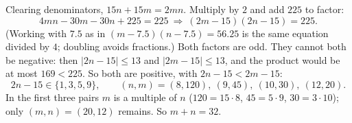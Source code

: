 Clearing denominators, $15n+15m=2mn$. Multiply by $2$ and add $225$ to factor:
\[
4mn-30m-30n+225=225\ \Longrightarrow\ (2m-15)(2n-15)=225 .
\]
(Working with $7.5$ as in $(m-7.5)(n-7.5)=56.25$ is the same equation divided by $4$; doubling avoids fractions.) Both factors are odd. They cannot both be negative: then $|2n-15|\le13$ and $|2m-15|\le13$, and the product would be at most $169<225$. So both are positive, with $2n-15<2m-15$:
\[
2n-15\in\{1,3,5,9\},\qquad (n,m)=(8,120),\ (9,45),\ (10,30),\ (12,20).
\]
In the first three pairs $m$ is a multiple of $n$ ($120=15\cdot8$, $45=5\cdot9$, $30=3\cdot10$); only $(m,n)=(20,12)$ remains. So $m+n=\boxed{32}$.
